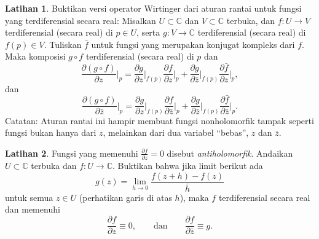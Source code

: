 \documentclass[12pt,openany]{book}
\newcommand{\C}{{\mathbb{C}}}
\newcommand{\myindex}[1]{#1\index{#1}}
\newcommand{\myquote}[1]{``#1''}
\theoremstyle{plain}
\theoremstyle{remark}
\theoremstyle{definition}
\newenvironment{exbox}{%
    \def\FrameCommand{\vrule width 1pt \relax\hspace{10pt}}%
    \MakeFramed{\advance\hsize-\width\FrameRestore}%
}{%
    \endMakeFramed
}
\theoremstyle{exercise}
\newtheorem{exercise}{Latihan}[section]
\theoremstyle{example}
\begin{document}
\begin{exbox}
\begin{exercise}%
\label{exercise:wirtingerchain}
Buktikan versi operator Wirtinger dari
aturan rantai
untuk fungsi yang terdiferensial secara
real: Misalkan $U \subset \C$ dan $V \subset \C$ terbuka, dan $f \colon U \to V$
terdiferensial (secara real) di $p \in U$, serta $g \colon V \to \C$ terdiferensial (secara real)
di $f(p) \in V$.  Tuliskan $\bar{f}$ untuk fungsi yang merupakan konjugat kompleks
dari $f$.  Maka komposisi $g \circ f$
terdiferensial (secara real) di $p$ dan
\begin{equation*}
\frac{\partial (g \circ f)}{\partial z}\Big|_p
=
\frac{\partial g}{\partial z}\Big|_{f(p)}
\frac{\partial f}{\partial z}\Big|_p
+
\frac{\partial g}{\partial \bar{z}}\Big|_{f(p)}
\frac{\partial \bar{f}}{\partial z}\Big|_p ,
\end{equation*}
dan
\begin{equation*}
\frac{\partial (g \circ f)}{\partial \bar{z}}\Big|_p
=
\frac{\partial g}{\partial z}\Big|_{f(p)}
\frac{\partial f}{\partial \bar{z}}\Big|_p
+
\frac{\partial g}{\partial \bar{z}}\Big|_{f(p)}
\frac{\partial \bar{f}}{\partial \bar{z}}\Big|_p .
\end{equation*}
Catatan: Aturan rantai ini hampir membuat fungsi nonholomorfik tampak seperti
fungsi bukan hanya dari $z$, melainkan dari dua variabel \myquote{bebas}, $z$ dan
$\bar{z}$.
\end{exercise}

\begin{exercise}
Fungsi yang memenuhi $\frac{\partial f}{\partial z} = 0$ disebut
\emph{\myindex{antiholomorfik}}.
Andaikan $U \subset \C$ terbuka dan $f \colon U \to \C$.
Buktikan bahwa jika limit berikut
ada
\begin{equation*}
g(z) = 
\lim_{h \to 0}
\frac{f(z+h)-f(z)}{\bar{h}}
\end{equation*}
untuk semua $z \in U$ (perhatikan garis di atas $h$),
maka $f$ terdiferensial secara real dan memenuhi
\begin{equation*}
\frac{\partial f}{\partial z} \equiv 0, \qquad \text{dan} \qquad
\frac{\partial f}{\partial \bar{z}} \equiv g .
\end{equation*}
\end{exercise}


\end{exbox}
\end{document}
